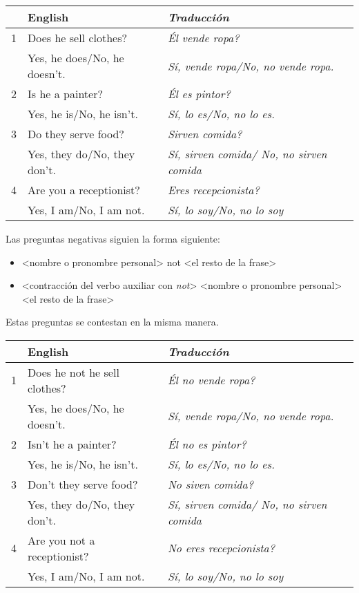 \begin{table}[H]
	\centering
	\begin{tabular}{lp{7cm}p{8cm}}
		\toprule
			& \textbf{English} & \textbf{\emph{Traducci\'on}} \\
		\midrule
			1 & Does he sell clothes? & \emph{\textquestiondown Él vende ropa?} \\
				& Yes, he does/No, he doesn't. & \emph{Sí, vende ropa/No, no vende ropa.} \\
			2 & Is he a painter? & \emph{\textquestiondown Él es pintor?} \\
				& Yes, he is/No, he isn't. & \emph{Sí, lo es/No, no lo es.} \\
			3 & Do they serve food? & \emph{\textquestiondown Sirven comida?} \\
				& Yes, they do/No, they don't. & \emph{Sí, sirven comida/ No, no sirven comida} \\
			4 & Are you a receptionist? & \emph{\textquestiondown Eres recepcionista?} \\
				& Yes, I am/No, I am not. & \emph{Sí, lo soy/No, no lo soy} \\
		\bottomrule
	\end{tabular}
\end{table}

Las preguntas negativas siguien la forma siguiente:
\begin{itemize}
	\item <conjugación correcta del verbo auxiliar> <nombre o pronombre personal> not <el resto de la frase>
	\item <contracción del verbo auxiliar con \emph{not}> <nombre o pronombre personal> <el resto de la frase>
\end{itemize}
Estas preguntas se contestan en la misma manera.

\begin{table}[H]
	\centering
	\begin{tabular}{lp{7cm}p{8cm}}
		\toprule
			& \textbf{English} & \textbf{\emph{Traducci\'on}} \\
		\midrule
			1 & Does he not he sell clothes? & \emph{\textquestiondown Él no vende ropa?} \\
				& Yes, he does/No, he doesn't. & \emph{Sí, vende ropa/No, no vende ropa.} \\
			2 & Isn't he a painter? & \emph{\textquestiondown Él no es pintor?} \\
				& Yes, he is/No, he isn't. & \emph{Sí, lo es/No, no lo es.} \\
			3 & Don't they serve food? & \emph{\textquestiondown No siven comida?} \\
				& Yes, they do/No, they don't. & \emph{Sí, sirven comida/ No, no sirven comida} \\
			4 & Are you not a receptionist? & \emph{\textquestiondown No eres recepcionista?} \\
				& Yes, I am/No, I am not. & \emph{Sí, lo soy/No, no lo soy} \\
		\bottomrule
	\end{tabular}
\end{table}

